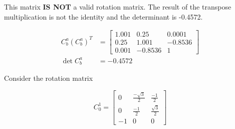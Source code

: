 \documentclass[12pt,letterpaper, onecolumn]{exam}
\begin{document}
\begin{questions}
\begin{parts}
        \solution
        This matrix \textbf{IS NOT} a valid rotation matrix. The result of the transpose multiplication is not the identity and the determinant is -0.4572.

        \begin{equation*}
            \begin{split}
                C_{b}^{a}(C_b^a)^T & =
                \begin{bmatrix}
                    1.001 & 0.25    & 0.0001  \\
                    0.25  & 1.001   & -0.8536 \\
                    0.001 & -0.8536 & 1
                \end{bmatrix} \\
                \det{C_b^a} & = -0.4572
            \end{split}
        \end{equation*}

    \end{parts}

    \clearpage

    \question
    Consider the rotation matrix

    \begin{equation*}
        C_{0}^{1} =
        \begin{bmatrix}
            0  & \frac{-\sqrt{3}}{2} & \frac{-1}{2}       \\
            0  & \frac{-1}{2}        & \frac{\sqrt{3}}{2} \\
            -1 & 0                   & 0
        \end{bmatrix}
    \end{equation*}

\end{questions}
\end{document}
